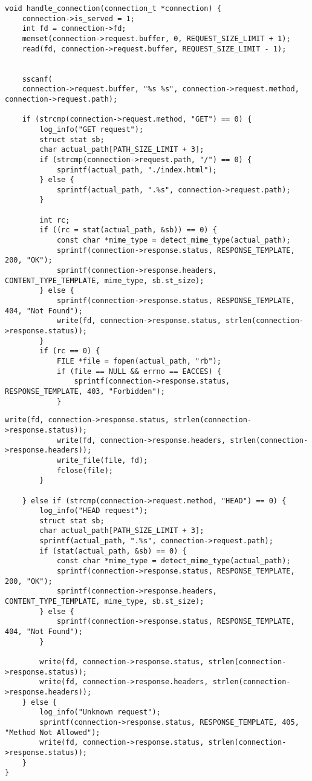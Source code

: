 \pagebreak

	\begin{lstlisting}[caption=Обработка запроса сервером]
void handle_connection(connection_t *connection) {
	connection->is_served = 1;
	int fd = connection->fd;
	memset(connection->request.buffer, 0, REQUEST_SIZE_LIMIT + 1);
	read(fd, connection->request.buffer, REQUEST_SIZE_LIMIT - 1);
	
	
	sscanf(
	connection->request.buffer, "%s %s", connection->request.method, connection->request.path);
	
	if (strcmp(connection->request.method, "GET") == 0) {
		log_info("GET request");
		struct stat sb;
		char actual_path[PATH_SIZE_LIMIT + 3];
		if (strcmp(connection->request.path, "/") == 0) {
			sprintf(actual_path, "./index.html");
		} else {
			sprintf(actual_path, ".%s", connection->request.path);
		}
		
		int rc;
		if ((rc = stat(actual_path, &sb)) == 0) {
			const char *mime_type = detect_mime_type(actual_path);
			sprintf(connection->response.status, RESPONSE_TEMPLATE, 200, "OK");
			sprintf(connection->response.headers, CONTENT_TYPE_TEMPLATE, mime_type, sb.st_size);
		} else {
			sprintf(connection->response.status, RESPONSE_TEMPLATE, 404, "Not Found");
			write(fd, connection->response.status, strlen(connection->response.status));
		}
		if (rc == 0) {
			FILE *file = fopen(actual_path, "rb");
			if (file == NULL && errno == EACCES) {
				sprintf(connection->response.status, RESPONSE_TEMPLATE, 403, "Forbidden");
			}
		\end{lstlisting}
		
		
		\begin{lstlisting}[caption=Обработка запроса сервером (продолжение)]
			write(fd, connection->response.status, strlen(connection->response.status));
			write(fd, connection->response.headers, strlen(connection->response.headers));
			write_file(file, fd);
			fclose(file);
		}
		
	} else if (strcmp(connection->request.method, "HEAD") == 0) {
		log_info("HEAD request");
		struct stat sb;
		char actual_path[PATH_SIZE_LIMIT + 3];
		sprintf(actual_path, ".%s", connection->request.path);
		if (stat(actual_path, &sb) == 0) {
			const char *mime_type = detect_mime_type(actual_path);
			sprintf(connection->response.status, RESPONSE_TEMPLATE, 200, "OK");
			sprintf(connection->response.headers, CONTENT_TYPE_TEMPLATE, mime_type, sb.st_size);
		} else {
			sprintf(connection->response.status, RESPONSE_TEMPLATE, 404, "Not Found");
		}
		
		write(fd, connection->response.status, strlen(connection->response.status));
		write(fd, connection->response.headers, strlen(connection->response.headers));
	} else {
		log_info("Unknown request");
		sprintf(connection->response.status, RESPONSE_TEMPLATE, 405, "Method Not Allowed");
		write(fd, connection->response.status, strlen(connection->response.status));
	}
}
\end{lstlisting}

